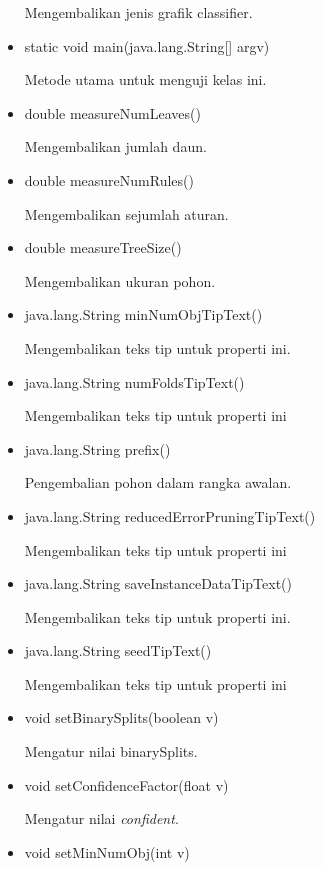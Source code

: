 \begin{itemize}
	Mengembalikan jenis grafik classifier.
	
	\item static void main(java.lang.String[] argv)
	
	Metode utama untuk menguji kelas ini.
	
	\item double measureNumLeaves()
	
	Mengembalikan jumlah daun.
	
	\item double measureNumRules()
	
	Mengembalikan sejumlah aturan.
	
	\item double measureTreeSize()
	
	Mengembalikan ukuran pohon.
	
	\item java.lang.String minNumObjTipText()
	
	Mengembalikan teks tip untuk properti ini.
	
	\item java.lang.String numFoldsTipText()
	
	Mengembalikan teks tip untuk properti ini
	
	\item java.lang.String prefix()
	
	Pengembalian pohon dalam rangka awalan.
	
	\item java.lang.String reducedErrorPruningTipText()
	
	Mengembalikan teks tip untuk properti ini
	
	\item java.lang.String saveInstanceDataTipText()
	
	Mengembalikan teks tip untuk properti ini.
	
	\item java.lang.String seedTipText()
	
	Mengembalikan teks tip untuk properti ini
	
	\item void setBinarySplits(boolean v)
	
	Mengatur nilai binarySplits.
	
	\item void setConfidenceFactor(float v)
	
	Mengatur nilai \textsl{confident}.
	
	\item void setMinNumObj(int v)
	

\end{itemize}
